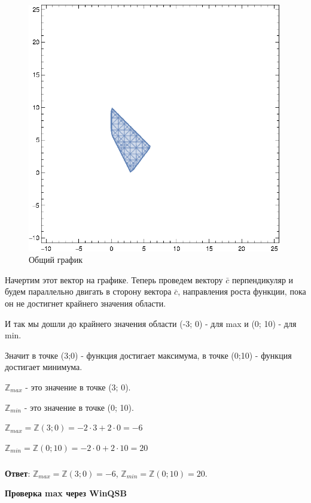 \begin{figure}[!htb]
\begin{minipage}{0.32\textwidth}
    \includegraphics[width=0.99\textwidth]
    {inc/6.eps}
  \end{minipage}
  \caption{Общий график}
  \label{fig:456}
\end{figure}

Начертим этот вектор на графике. Теперь проведем вектору $\bar{c}$ перпендикуляр
и будем параллельно двигать в сторону вектора $\bar{c}$,
направления роста функции,
пока он не достигнет крайнего значения области.

И так мы дошли до крайнего значения области (-3; 0) - для max и (0; 10) - для min.

Значит в точке (3;0) - функция достигает максимума,
в точке (0;10) - функция достигает минимума.

$\mathbb{Z}_{max}$ - это значение в точке (3; 0).

$\mathbb{Z}_{min}$ - это значение в точке (0; 10).

$\mathbb{Z}_{max} = \mathbb{Z}(3; 0) = -2\cdot 3 + 2\cdot 0 = -6$

$\mathbb{Z}_{min} = \mathbb{Z}(0; 10) = -2\cdot 0 + 2 \cdot 10 = 20$

\subparagraph{} \textbf{Ответ}: $\mathbb{Z}_{max} = \mathbb{Z}(3;0)=-6$, $\mathbb{Z}_{min} = \mathbb{Z}(0; 10) = 20$.

\newpage

\begin{center}
\textbf{Проверка max через WinQSB}
\end{center}

